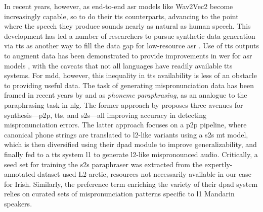 \documentclass[thesis]{cluu}
\begin{document}
In recent years, however, as end-to-end \gls{asr} models like Wav2Vec2 become increasingly capable, so to do their \gls{tts} counterparts, advancing to the point where the speech they produce sounds nearly as natural as human speech. This development has led a number of researchers to pursue synthetic data generation via \gls{tts} as another way to fill the data gap for low-resource \gls{asr} \parencite[see][inter alia]{barteldsMakingMoreLittle2023,thaiSyntheticDataAugmentation2019,fazelSynthASRUnlockingSynthetic2021}. Use of \gls{tts} outputs to augment data has been demonstrated to provide improvements in \gls{wer} for \gls{asr} models \parencite{barteldsMakingMoreLittle2023}, with the caveats that not all languages have readily available \gls{tts} systems. For \gls{mdd}, however, this inequality in \gls{tts} availability is less of an obstacle to providing useful data. The task of generating mispronunciation data has been framed in recent years by \textcite{korzekwaComputerassistedPronunciationTraining2022} and \textcite{zhangL2GENNeuralPhoneme2022} as \textit{phoneme paraphrasing}, as an analogue to the paraphrasing task in \gls{nlg}. The former approach by \textcite{korzekwaComputerassistedPronunciationTraining2022} proposes three avenues for synthesis---\gls{p2p}, \gls{tts}, and \gls{s2s}---all improving accuracy in detecting mispronunciation errors. The latter approach focuses on a \gls{p2p} pipeline, where canonical phone strings are translated to \gls{l2}-like variants using a \gls{s2s} \gls{mt} model, which is then diversified using their \gls{dpad} module to improve generalizability, and finally fed to a \gls{tts} system \gls{l1} to generate \gls{l2}-like mispronounced audio. Critically, a seed set for training the \gls{s2s} paraphraser was extracted from the expertly-annotated dataset used L2-arctic, resources not necessarily available in our case for Irish. Similarly, the preference term enriching the variety of their \gls{dpad} system relies on curated sets of mispronunciation patterns specific to \gls{l1} Mandarin speakers.
\end{document}
